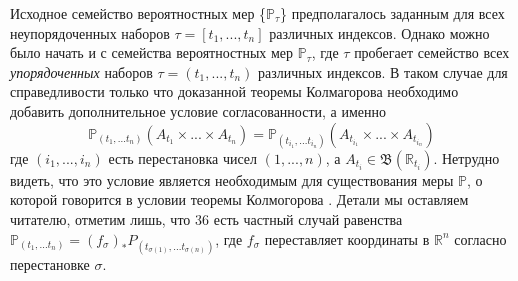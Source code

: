 \begin{remark} Исходное семейство вероятностных мер \{$\mathbb{P}_{\tau}$\} предполагалось заданным для всех неупорядоченных наборов $\tau = [t_1,...,t_n] $ различных индексов. Однако можно было начать и с семейства вероятностных мер $\mathbb{P}_{\tau}$, где $\tau$ пробегает семейство всех {\it упорядоченных} наборов  $\tau = (t_1,...,t_n)$ различных индексов. В таком случае для справедливости только что доказанной теоремы Колмагорова необходимо добавить дополнительное условие согласованности, а именно
\begin{equation}
\mathbb{P}_{(t_1, ...t_n)}(A_{t_1}\times...\times A_{t_n}) = \mathbb{P}_{(t_{i_1}, ...t_{i_n})}(A_{t_{i_1}}\times...\times A_{t_{i_n}})
\end{equation}
где $(i_1, ..., i_n)$ есть перестановка чисел $(1,...,n)$, а $A_{t_i} \in \mathfrak{B}(\mathbb{R}_{t_i})$. Нетрудно видеть, что это условие является необходимым для существования меры $\mathbb{P}$, о которой говорится в условии теоремы Колмогорова . Детали мы оставляем читателю, отметим лишь, что 36 есть частный случай равенства $\mathbb{P}_{(t_1, ...t_n)} = (f_{\sigma})_*{P}_{(t_{\sigma(1)}, ...t_{\sigma(n)})}$, где $f_{\sigma}$ переставляет координаты в $\mathbb{R}^n$ согласно перестановке $\sigma$.
\end{remark}






